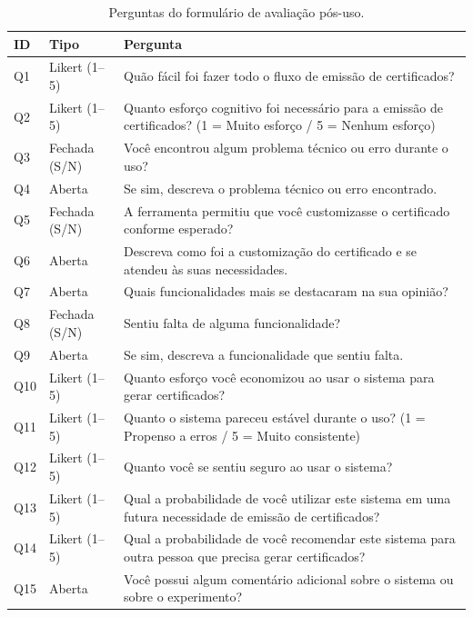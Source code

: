 \documentclass[article,a4paper,12pt,brazil,sumario=tradicional]{abntex2}
\begin{document}
\begin{table}[htbp]
    \centering
    \caption{Perguntas do formulário de avaliação pós-uso.}
    \label{tab:perguntas-avaliacao}
    \begin{tabular}{|C{1cm}|C{2.5cm}|C{8.5cm}|}
        \hline
        \textbf{ID} & \textbf{Tipo} & \textbf{Pergunta} \\
        \hline
        Q1  & Likert (1--5) & Quão fácil foi fazer todo o fluxo de emissão de certificados? \\
        \hline
        Q2  & Likert (1--5) & Quanto esforço cognitivo foi necessário para a emissão de certificados? (1 = Muito esforço / 5 = Nenhum esforço) \\
        \hline
        Q3  & Fechada (S/N) & Você encontrou algum problema técnico ou erro durante o uso? \\
        \hline
        Q4  & Aberta & Se sim, descreva o problema técnico ou erro encontrado. \\
        \hline
        Q5  & Fechada (S/N) & A ferramenta permitiu que você customizasse o certificado conforme esperado? \\
        \hline
        Q6  & Aberta & Descreva como foi a customização do certificado e se atendeu às suas necessidades. \\
        \hline
        Q7  & Aberta & Quais funcionalidades mais se destacaram na sua opinião? \\
        \hline
        Q8  & Fechada (S/N) & Sentiu falta de alguma funcionalidade? \\
        \hline
        Q9  & Aberta & Se sim, descreva a funcionalidade que sentiu falta. \\
        \hline
        Q10 & Likert (1--5) & Quanto esforço você economizou ao usar o sistema para gerar certificados? \\
        \hline
        Q11 & Likert (1--5) & Quanto o sistema pareceu estável durante o uso? (1 = Propenso a erros / 5 = Muito consistente) \\
        \hline
        Q12 & Likert (1--5) & Quanto você se sentiu seguro ao usar o sistema? \\
        \hline
        Q13 & Likert (1--5) & Qual a probabilidade de você utilizar este sistema em uma futura necessidade de emissão de certificados? \\
        \hline
        Q14 & Likert (1--5) & Qual a probabilidade de você recomendar este sistema para outra pessoa que precisa gerar certificados? \\
        \hline
        Q15 & Aberta & Você possui algum comentário adicional sobre o sistema ou sobre o experimento? \\
        \hline
    \end{tabular}

\end{table}
\end{document}
